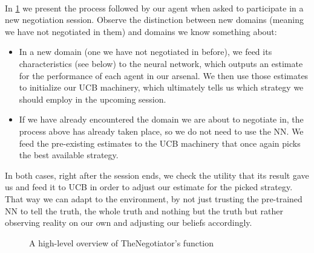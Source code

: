 \paragraph*{}
In \cref{fig:high_level_overview} we present the process followed by our agent when asked to participate in a new negotiation session. Observe the distinction between new domains (meaning we have not negotiated in them) and domains we know something about: 
\begin{itemize}
    \item In a new domain (one we have not negotiated in before), we feed its characteristics (see  below) %
    to the neural network, which outputs an estimate for the performance of each agent in our arsenal. We then use those estimates to initialize our UCB machinery, which ultimately tells us which strategy we should employ in the upcoming session.
    
    \item If we have already encountered the domain we are about to negotiate in, the process above has already taken place, so we do not need to use the NN. We feed the pre-existing estimates to the UCB machinery that once again picks the best available strategy.
\end{itemize}
In both cases, right after the session ends, we check the utility that its result gave us and feed it to UCB in order to adjust our estimate for the picked strategy. That way we can adapt to the environment, by not just trusting the pre-trained NN to tell the truth, the whole truth and nothing but the truth but rather observing reality on our own and adjusting our beliefs accordingly. %

\begin{figure}[H]
\centering
{}
\captionsetup{justification=centering}
\caption{A high-level overview of TheNegotiator's function}
\label{fig:high_level_overview}
\end{figure}
